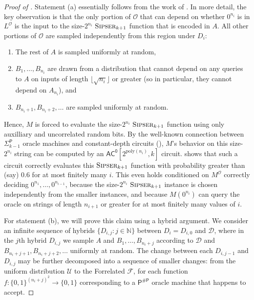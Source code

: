 \documentclass[10pt,a4paper]{article}
\newcommand{\Naturals}{\mathbb{N}}
\newcommand{\poly}{\mathrm{poly}}
\newcommand{\Sipser}{\normalfont\textsc{Sipser}}
\begin{document}
\begin{proof}[Proof of ]
Statement (a) essentially follows from the work of \cite{HRST17}. In more detail, the key observation is that the only portion of $\mathcal{O}$ that can depend on whether $0^{n_i}$ is in $L^\mathcal{O}$ is the input to the size-$2^{n_i}$ $\Sipser_{k+1}$ function that is encoded in $A$. All other portions of $\mathcal{O}$ are sampled independently from this region under $D_i$:
\begin{enumerate}
\item The rest of $A$ is sampled uniformly at random,
\item $B_1,\ldots,B_{n_i}$ are drawn from a distribution that cannot depend on any queries to $A$ on inputs of length $\lfloor \sqrt{n_i} \rfloor$ or greater (so in particular, they cannot depend on $A_{n_i}$), and
\item $B_{n_i+1}, B_{n_i + 2},\ldots$ are sampled uniformly at random.
\end{enumerate}
Hence, $M$ is forced to evaluate the size-$2^{n_i}$ $\Sipser_{k+1}$ function using only auxilliary and uncorrelated random bits. By the well-known connection between $\mathsf{\Sigma}_{k-1}^\mathsf{P}$ oracle machines and constant-depth circuits (), $M$'s behavior on this size-$2^{n_i}$ string can be computed by an $\mathsf{AC^0}\left[2^{\poly(n_i)}, k\right]$ circuit.  shows that such a circuit correctly evaluates this $\Sipser_{k+1}$ function with probability greater than (say) 0.6 for at most finitely many $i$. This even holds conditioned on $M^\mathcal{O}$ correctly deciding $0^{n_1},\dots,0^{n_{i-1}}$, because the size-$2^{n_i}$ $\Sipser_{k+1}$ instance is chosen independently from the smaller instances, and because $M\left(0^{n_i}\right)$ can query the oracle on strings of length $n_{i+1}$ or greater for at most finitely many values of $i$.

For statement (b), we will prove this claim using a hybrid argument. We consider an infinite sequence of hybrids $\{D_{i,j} : j \in \Naturals\}$ between $D_i = D_{i,0}$ and $\mathcal{D}$, where in the $j$th hybrid $D_{i,j}$ we sample $A$ and $B_1,\ldots,B_{n_i + j}$ according to $\mathcal{D}$ and $B_{n_i + j + 1}, B_{n_i + j+2}, \ldots$ uniformly at random. The change between each $D_{i,j-1}$ and $D_{i,j}$ may be further decomposed into a sequence of smaller changes: from the uniform distribution $\mathcal{U}$ to the Forrelated $\mathcal{F}$, for each function $f: \{0,1\}^{(n_i + j)^2} \to \{0,1\}$ corresponding to a $\mathsf{P^{\# P}}$ oracle machine that happens to accept. 


\end{proof}
\end{document}
